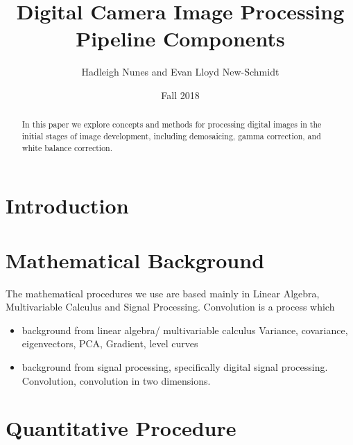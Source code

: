 \documentclass{article}
\title{Digital Camera Image Processing Pipeline Components}
\author{Hadleigh Nunes and Evan Lloyd New-Schmidt}
\date{Fall 2018}
\begin{document}
\maketitle

\begin{abstract}
    In this paper we explore concepts and methods for processing digital images in the initial stages of image development, including demosaicing, gamma correction, and white balance correction.
\end{abstract}

\section{Introduction}



\cite{picameradocs}




\section{Mathematical Background}
The mathematical procedures we use are based mainly in Linear Algebra, Multivariable Calculus and Signal Processing. 
Convolution is a process which 

\begin{itemize}
    \item background from linear algebra/ multivariable calculus
    Variance, covariance, eigenvectors, PCA, Gradient, level curves 
    
    \item background from signal processing, specifically digital signal processing.
    Convolution, convolution in two dimensions. 
    
\end{itemize}

\section{Quantitative Procedure}
\end{document}
